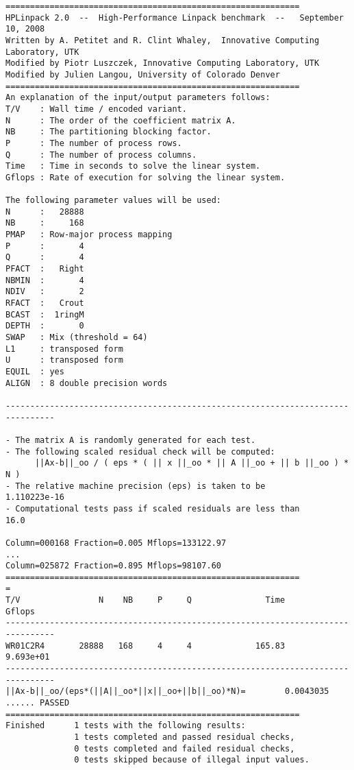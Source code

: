 \documentclass[a4paper]{report}
\begin{document}
\begin{verbatim}
============================================================
HPLinpack 2.0  --  High-Performance Linpack benchmark  --   September 10, 2008
Written by A. Petitet and R. Clint Whaley,  Innovative Computing Laboratory, UTK
Modified by Piotr Luszczek, Innovative Computing Laboratory, UTK
Modified by Julien Langou, University of Colorado Denver
============================================================
An explanation of the input/output parameters follows:
T/V    : Wall time / encoded variant.
N      : The order of the coefficient matrix A.
NB     : The partitioning blocking factor.
P      : The number of process rows.
Q      : The number of process columns.
Time   : Time in seconds to solve the linear system.
Gflops : Rate of execution for solving the linear system.

The following parameter values will be used:
N      :   28888
NB     :     168
PMAP   : Row-major process mapping
P      :       4
Q      :       4
PFACT  :   Right
NBMIN  :       4
NDIV   :       2
RFACT  :   Crout
BCAST  :  1ringM
DEPTH  :       0
SWAP   : Mix (threshold = 64)
L1     : transposed form
U      : transposed form
EQUIL  : yes
ALIGN  : 8 double precision words

--------------------------------------------------------------------------------

- The matrix A is randomly generated for each test.
- The following scaled residual check will be computed:
      ||Ax-b||_oo / ( eps * ( || x ||_oo * || A ||_oo + || b ||_oo ) * N )
- The relative machine precision (eps) is taken to be               1.110223e-16
- Computational tests pass if scaled residuals are less than                16.0

Column=000168 Fraction=0.005 Mflops=133122.97
...
Column=025872 Fraction=0.895 Mflops=98107.60
============================================================
=
T/V                N    NB     P     Q               Time                 Gflops
--------------------------------------------------------------------------------
WR01C2R4       28888   168     4     4             165.83              9.693e+01
--------------------------------------------------------------------------------
||Ax-b||_oo/(eps*(||A||_oo*||x||_oo+||b||_oo)*N)=        0.0043035 ...... PASSED
============================================================
Finished      1 tests with the following results:
              1 tests completed and passed residual checks,
              0 tests completed and failed residual checks,
              0 tests skipped because of illegal input values.
\end{verbatim}
\end{document}
